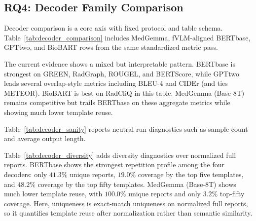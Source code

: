 \subsection{RQ4: Decoder Family Comparison}
Decoder comparison is a core axis with fixed protocol and table schema. Table~\ref{tab:decoder_comparison} includes MedGemma, fVLM-aligned \ac{BERTbase}, \ac{GPTtwo}, and BioBART rows from the same standardized metric pass.

The current evidence shows a mixed but interpretable pattern. \ac{BERTbase} is strongest on \ac{GREEN}, \ac{RadGraph}, \ac{ROUGEL}, and \ac{BERTScore}, while \ac{GPTtwo} leads several overlap-style metrics including BLEU-4 and \ac{CIDEr} (and ties METEOR). BioBART is best on \ac{RadCliQ} in this table. MedGemma (Base-8T) remains competitive but trails \ac{BERTbase} on these aggregate metrics while showing much lower template reuse.

Table~\ref{tab:decoder_sanity} reports neutral run diagnostics such as sample count and average output length.

Table~\ref{tab:decoder_diversity} adds diversity diagnostics over normalized full reports. \ac{BERTbase} shows the strongest repetition profile among the four decoders: only $41.3\%$ unique reports, $19.0\%$ coverage by the top five templates, and $48.2\%$ coverage by the top fifty templates. MedGemma (Base-8T) shows much lower template reuse, with $100.0\%$ unique reports and only $3.2\%$ top-fifty coverage. Here, uniqueness is exact-match uniqueness on normalized full reports, so it quantifies template reuse after normalization rather than semantic similarity.

\begin{table}[htbp]
    \centering
    \caption{Decoder comparison on CT-RATE under a shared organ-attention frontend.}
    \label{tab:decoder_comparison}
\end{table}

